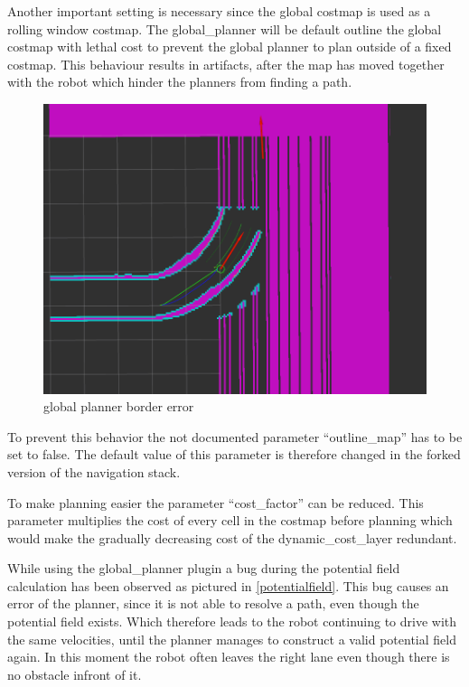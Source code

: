 Another important setting is necessary since the global costmap is used as a rolling window costmap. The global\_planner will be default outline the global costmap with lethal cost to prevent the global planner to plan outside of a fixed costmap. This behaviour results in artifacts, after the map has moved together with the robot which hinder the planners from finding a path.

\begin{figure}[H]
	\centering
	\includegraphics[width=\textwidth]{Pictures/borders}
	
	\caption{global planner border error}
	\label{boardererror}
\end{figure}

To prevent this behavior the not documented parameter ``outline\_map'' has to be set to false. The default value of this parameter is therefore changed in the forked version of the navigation stack.

To make planning easier the parameter ``cost\_factor'' can be reduced. This parameter multiplies the cost of every cell in the costmap before planning which
 would make the gradually decreasing cost of the dynamic\_cost\_layer redundant.
 
 
 While using the global\_planner plugin a bug during the potential field calculation has been observed as pictured in \ref{potentialfield}. This bug causes an error of the planner, since it is not able to resolve a path, even though the potential field exists. Which therefore leads to the robot continuing to drive with the same velocities,  until the planner manages to construct a valid potential field again. In this moment the robot often leaves the right lane even though there is no obstacle infront of it.
 
